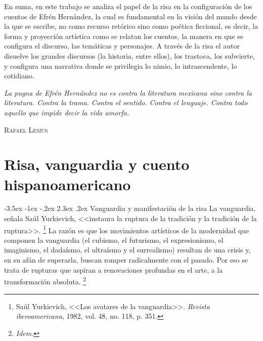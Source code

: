 \documentclass[14pt,twoside,final]{extbook} %
\makeatletter
\let\oldfootnote\footnote
\renewcommand\footnote[1]{%
\oldfootnote{\hspace{1mm}#1}}
\renewcommand\section{\@startsection {section}{1}{\z@}%
                                     {-3.5ex \@plus -1ex \@minus -.2ex}%
                                     {2.3ex \@plus .2ex}%
                                     {\normalfont\large\bfseries\sc}}
\makeatother
\begin{document}
En suma, en este trabajo se analiza el papel de la risa en la configuración de los cuentos de Efrén Hernández, la cual es fundamental en la visión del mundo desde la que se escribe, no como recurso retórico sino como poética ficcional, es decir, la forma y proyección artística como se relatan los cuentos, la manera en que se configura el discurso, las temáticas y personajes. A través de la risa el autor disuelve los grandes discursos (la historia, entre ellos), los trastoca, los subvierte, y configura una narrativa donde se privilegia lo nimio, lo intrascendente, lo cotidiano.
\newpage
\pagestyle{empty}
\null\vfill
\newpage
\pagestyle{empty}
\vspace*{42pt}
\begin{flushright}
\begin{minipage}{7.5cm}
\emph{La pugna de Efrén Hernández no es contra la literatura mexicana sino contra la literatura. Contra la trama. Contra el sentido. Contra el lenguaje. Contra todo aquello que impide decir la vida amorfa.}
\begin{flushright}
\textsc{Rafael Lemus}
\end{flushright}
\end{minipage}
\end{flushright}
\chapter{Risa, vanguardia y cuento hispanoamericano}\label{ch:risa-vanguardia-y-cuento-hispanoamericano}
\BgThispage
\thispagestyle{empty}
\pagestyle{fancy}
\fancyhf{} %
\fancyhead[RO,LE]{\textlf{\thepage}}
\renewcommand{\headrulewidth}{0pt}
\setcounter{page}{25}
\section{Vanguardia y manifestación de la risa}\label{sec:vanguardia-y-manifestacion-de-la-risa}
La vanguardia, señala Saúl Yurkievich, <<instaura la ruptura de la tradición y la
tradición de la ruptura>>.\footnote{Saúl Yurkievich, <<Los avatares de la vanguardia>>. \emph{Revista iberoamericana}, 1982, vol. 48, no. 118, p. 351.} La razón es que los movimientos artísticos de la modernidad que componen la vanguardia (el cubismo, el futurismo, el expresionismo, el imaginismo, el dadaísmo, el ultraísmo y el surrealismo) resultan de una crisis y, en su afán de superarla, buscan romper radicalmente con el pasado. Por eso se trata de rupturas que aspiran a renovaciones profundas en el arte, a la transformación absoluta.\footnote{\emph{Idem}.}
\end{document}
